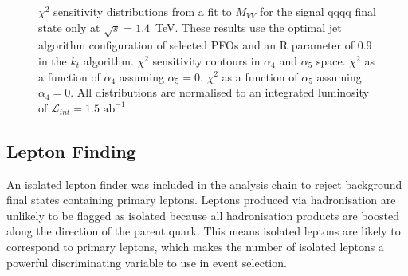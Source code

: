 \begin{figure}[h!]
\caption[$\chi^{2}$ sensitivity distributions from a fit to the invariant mass of the visible system, $M_{VV}$, for the signal {\nu}{\nu}qqqq final state only at $\sqrt{s}=1.4$~TeV.  These results use the optimal jet algorithm configuration of selected PFOs and an R parameter of 0.9 in the $k_{t}$ algorithm.  \protect{} $\chi^{2}$ sensitivity contours in $\alpha_{4}$ and $\alpha_{5}$ space.  \protect{} $\chi^{2}$ as a function of $\alpha_{4}$ assuming $\alpha_{5} = 0$.  \protect{} $\chi^{2}$ as a function of $\alpha_{5}$ assuming $\alpha_{4} = 0$.  All distributions are normalised to an integrated luminosity of $\mathcal{L}_{int} = 1.5\text{ ab}^{-1}$.]{$\chi^{2}$ sensitivity distributions from a fit to $M_{VV}$ for the signal {\nu}{\nu}qqqq final state only at $\sqrt{s}=1.4$~TeV.  These results use the optimal jet algorithm configuration of selected PFOs and an R parameter of 0.9 in the $k_{t}$ algorithm.  \protect{} $\chi^{2}$ sensitivity contours in $\alpha_{4}$ and $\alpha_{5}$ space.  \protect{} $\chi^{2}$ as a function of $\alpha_{4}$ assuming $\alpha_{5} = 0$.  \protect{} $\chi^{2}$ as a function of $\alpha_{5}$ assuming $\alpha_{4} = 0$.  All distributions are normalised to an integrated luminosity of $\mathcal{L}_{int} = 1.5\text{ ab}^{-1}$.}
\label{fig:allchi2jetalgoideal1400GeV}
\end{figure}


\subsection{Lepton Finding} 
\label{sec:isolatedleptonfinding}
An isolated lepton finder \cite{Wendt:2007iw} was included in the analysis chain to reject background final states containing primary leptons.  Leptons produced via hadronisation are unlikely to be flagged as isolated because all hadronisation products are boosted along the direction of the parent quark.  This means isolated leptons are likely to correspond to primary leptons, which makes the number of isolated leptons a powerful discriminating variable to use in event selection.  

